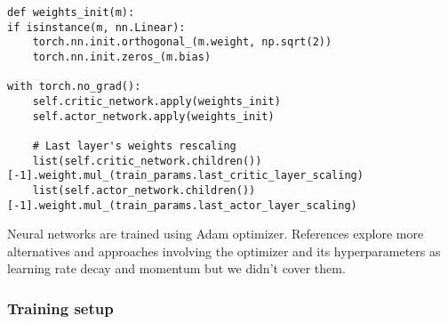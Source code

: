 \documentclass[11pt, a4paper, hidelinks]{report}
\begin{document}
\begin{lstlisting}[label={lst:psppo-net-init}]
def weights_init(m):
if isinstance(m, nn.Linear):
	torch.nn.init.orthogonal_(m.weight, np.sqrt(2))
	torch.nn.init.zeros_(m.bias)

with torch.no_grad():
	self.critic_network.apply(weights_init)
	self.actor_network.apply(weights_init)

	# Last layer's weights rescaling
	list(self.critic_network.children())[-1].weight.mul_(train_params.last_critic_layer_scaling)
	list(self.actor_network.children())[-1].weight.mul_(train_params.last_actor_layer_scaling)
\end{lstlisting}

Neural networks are trained using Adam optimizer.
References explore more alternatives and approaches involving the optimizer and its hyperparameters as learning rate decay and momentum but we didn't cover them.

\subsubsection{Training setup}\label{subsubsec:training-setup}
\end{document}
